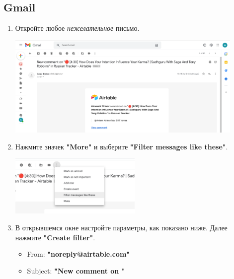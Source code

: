 \documentclass[
a4paper, %
12pt, %
article,
onecolumn, %
openany, %
]{memoir}
\begin{document}
\subsection{Gmail}
\begin{enumerate}
    \item Откройте любое \emph{нежелательное} письмо.
	    \begin{center} 
	        \includegraphics[width=0.9\textwidth]{AirTableSpam/gmail0} 
	    \end{center}
    \item Нажмите значек \textbf{"More"} и выберите 
                \textbf{"Filter messages like these"}.
	    \begin{center} 
	        \includegraphics[width=0.5\textwidth]{AirTableSpam/gmail1} 
	    \end{center}
    \item В открывшемся окне настройте параметры, как показано ниже. 
        Далее нажмите \textbf{"Create filter"}.
        \begin{itemize}
            \item From: \textbf{"noreply@airtable.com"}
            \item Subject: \textbf{"New comment on "}
        \end{itemize}


\end{enumerate}
\end{document}
